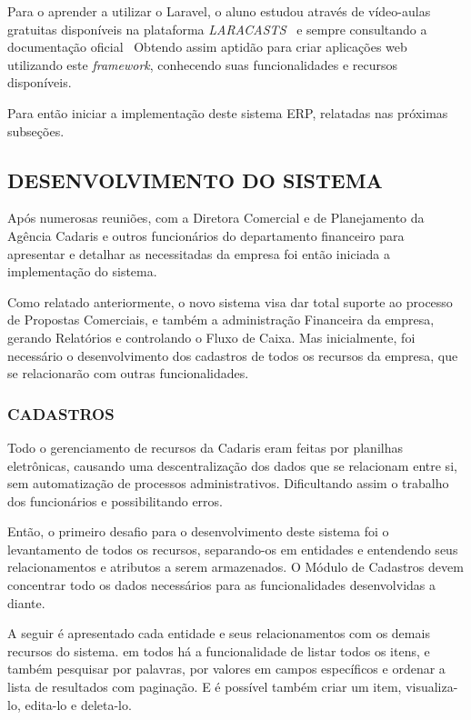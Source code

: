 \documentclass[
  12pt,            %
  openany,
  oneside,
  a4paper,         %
  english,      %
  brazil
]{article}
\numberwithin{figure}{section}
\numberwithin{table}{section}
\begin{document}
Para o aprender a utilizar o Laravel, o aluno estudou através de vídeo-aulas gratuitas disponíveis na plataforma \textit{LARACASTS}~\cite{laracasts} e sempre consultando a documentação oficial~\cite{laraveldocs} Obtendo assim aptidão para criar aplicações web utilizando este \textit{framework}, conhecendo suas funcionalidades e recursos disponíveis.

Para então iniciar a implementação deste sistema ERP, relatadas nas próximas subseções.


\subsection{DESENVOLVIMENTO DO SISTEMA}

Após numerosas reuniões, com a Diretora Comercial e de Planejamento da Agência Cadaris e outros funcionários do departamento financeiro para apresentar e detalhar as necessitadas da empresa foi então iniciada a implementação do sistema.

Como relatado anteriormente, o novo sistema visa dar total suporte ao processo de Propostas Comerciais, e também a administração Financeira da empresa, gerando Relatórios e controlando o Fluxo de Caixa. Mas inicialmente, foi necessário o desenvolvimento dos cadastros de todos os recursos da empresa, que se relacionarão com outras funcionalidades.


\subsubsection{CADASTROS}
Todo o gerenciamento de recursos da Cadaris eram feitas por planilhas eletrônicas, causando uma descentralização dos dados que se relacionam entre si, sem automatização de processos administrativos. Dificultando assim o trabalho dos funcionários e possibilitando erros.

Então, o primeiro desafio para o desenvolvimento deste sistema foi o levantamento de todos os recursos, separando-os em entidades e entendendo seus relacionamentos e atributos a serem armazenados. O Módulo de Cadastros devem concentrar todo os dados necessários para as funcionalidades desenvolvidas a diante.

A seguir é apresentado cada entidade e seus relacionamentos com os demais recursos do sistema. em todos há a funcionalidade de listar todos os itens, e também pesquisar por palavras, por valores em campos específicos e ordenar a lista de resultados com paginação. E é possível também criar um item, visualiza-lo, edita-lo e deleta-lo.
\end{document}
